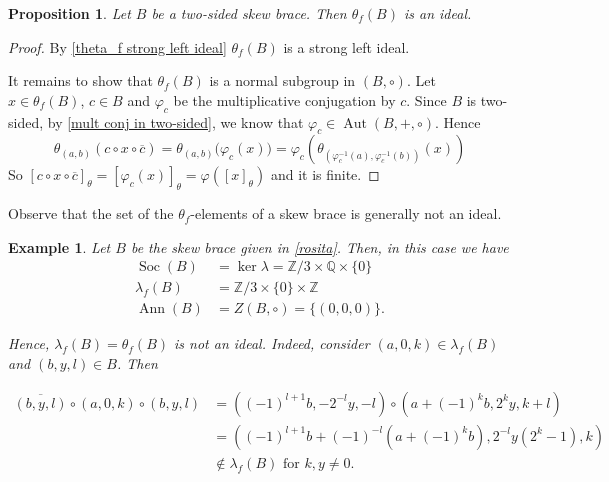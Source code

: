 \documentclass{amsart}
\newcommand{\Aut}{\operatorname{Aut}}
\newcommand{\Q}{\mathbb{Q}}
\newcommand{\Z}{\mathbb{Z}}
\newcommand{\Ann}{\operatorname{Ann}}
\newcommand{\Soc}{\operatorname{Soc}}
\newtheorem{pro}[thm]{Proposition}
\newtheorem{exa}[thm]{Example}
\begin{document}
\begin{pro}
    Let $B$ be a two-sided skew brace. Then $\theta_f(B)$ is an ideal.
\end{pro}
\begin{proof}
    By \cref{theta_f strong left ideal} $\theta_f(B)$ is a strong left ideal.

    It remains to show that $\theta_f(B)$ is a normal subgroup in $(B,\circ)$.
    Let $x\in \theta_f(B)$, $c\in B$ and 
    $\varphi_c$ be the multiplicative conjugation by $c$.
    Since $B$ is two-sided, by \cref{mult conj in two-sided}, we know that $\varphi_c\in\Aut(B,+,\circ)$.
    Hence 
    \[
    \theta_{(a,b)}(c\circ x\circ \overline{c})=
    \theta_{(a,b)}\big(\varphi_c(x))=
    \varphi_c\left(\theta_{\left(\varphi_c^{-1}(a),\varphi_c^{-1}(b)\right)}(x)\right)
    \]
    So
    $[c\circ x\circ \overline{c}]_\theta=
    [\varphi_c(x)]_\theta
    =\varphi([x]_\theta)$ and it is finite.
\end{proof}

Observe that the set of the $\theta_f$-elements of a skew brace is generally not an ideal. 
\begin{exa}
Let $B$ be the skew brace given in \cref{rosita}. Then,
in this case we have 
\begin{align*}
    \Soc(B)&=\ker\lambda=\Z/3\times\Q\times\{0\}\\
\lambda_f(B)&=\Z/3\times \{0\}\times\Z\\
\Ann(B)&=Z(B,\circ)=\{(0,0,0)\}.
\end{align*}

Hence, $\lambda_f(B)=\theta_f(B)$ is not an ideal. Indeed, consider $(a,0,k)\in \lambda_f(B)$ and $(b,y,l)\in B$. Then 


\begin{align*}
   \overline{(b,y,l)}\circ (a,0,k)\circ (b,y,l)  &=((-1)^{l+1}b,-2^{-l}y,-l)\circ (a+(-1)^kb,2^ky,k+l)\\
&=((-1)^{l+1}b+(-1)^{-l}(a+(-1)^kb),2^{-l}y(2^k-1),k) \\
&\notin \lambda_f(B) \text{ for } k,y\neq 0.
\end{align*}
\end{exa}
\end{document}

